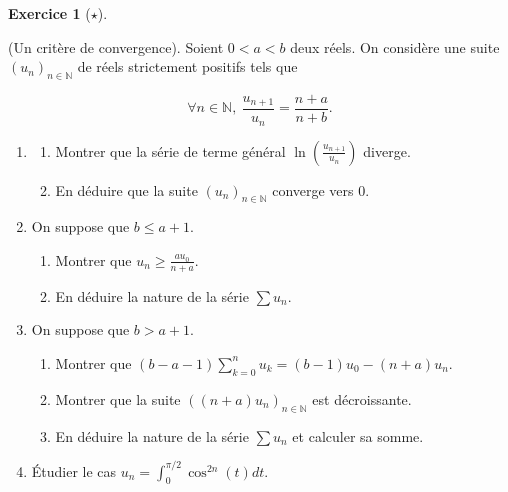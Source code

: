 \documentclass[
  french,
  letterpaper,
  DIV=11,
  numbers=noendperiod]{scrreprt}
\theoremstyle{plain}
\theoremstyle{definition}
\theoremstyle{plain}
\theoremstyle{plain}
\theoremstyle{definition}
\newtheorem{exercise}{Exercice}[chapter]
\theoremstyle{definition}
\theoremstyle{plain}
\theoremstyle{remark}
\begin{document}
\begin{exercise}[\(\star\)]\protect\hypertarget{exr-02-1}{}\label{exr-02-1}

(Un critère de convergence). Soient \(0<a<b\) deux réels. On considère
une suite \((u_n)_{n\in\mathbb{N}}\) de réels strictement positifs tels
que

\[
\forall n\in\mathbb{N},\
\frac{u_{n+1}}{u_n} = \frac{n+a}{n+b}.
\]

\begin{enumerate}
\def\labelenumi{\arabic{enumi}.}
\item
  \begin{enumerate}
  \def\labelenumii{\alph{enumii}.}
  \item
    Montrer que la série de terme général
    \(\ln\left(\frac{u_{n+1}}{u_n}\right)\) diverge.
  \item
    En déduire que la suite \((u_n)_{n\in\mathbb{N}}\) converge vers
    \(0\).
  \end{enumerate}
\item
  On suppose que \(b\leqslant a+1\).

  \begin{enumerate}
  \def\labelenumii{\alph{enumii}.}
  \item
    Montrer que \(u_n\geqslant \frac{au_0}{n+a}\).
  \item
    En déduire la nature de la série \(\sum u_n\).
  \end{enumerate}
\item
  On suppose que \(b>a+1\).

  \begin{enumerate}
  \def\labelenumii{\alph{enumii}.}
  \item
    Montrer que \((b-a-1)\sum_{k=0}^n u_k = (b-1)u_0 - (n+a)u_n\).
  \item
    Montrer que la suite \(((n+a)u_n)_{n\in\mathbb{N}}\) est
    décroissante.
  \item
    En déduire la nature de la série \(\sum u_n\) et calculer sa somme.
  \end{enumerate}
\item
  Étudier le cas \(u_n = \int_0^{\pi/2}\cos^{2n}(t)dt\).
\end{enumerate}

\end{exercise}
\end{document}
